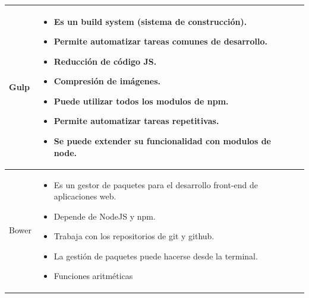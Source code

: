 \newpage
\begin{table}[b!]
\centering
\begin{tabular}{|p{2cm}|ll}
        \hline
          \multicolumn{1}{|p{5cm}|}{Gulp}& 
          \multicolumn{1}{p{10cm}|}{
          \begin{itemize}
          \vspace{5mm}
          \item Es un build system (sistema de construcción).
        \item Permite automatizar tareas comunes de desarrollo.
        \item Reducción de código JS.
        \item Compresión de imágenes.
        \item Puede utilizar todos los modulos de npm.
        \item Permite automatizar tareas repetitivas.
        \item Se puede extender su funcionalidad con modulos de node.

      \end{itemize}} \\
\hline
            \multicolumn{1}{|p{5cm}|}{Bower}& 
          \multicolumn{1}{p{10cm}|}{
          \begin{itemize}
          \vspace{10mm}
          \item Es un gestor de paquetes para el desarrollo front-end de aplicaciones web.
          \item Depende de NodeJS y npm.
        \item Trabaja con los repositorios de git y github.
        \item La gestión de paquetes puede hacerse desde la terminal.
        \item Funciones aritméticas
      \end{itemize}} \\
      \hline
      \end{tabular}
    \end{table}

